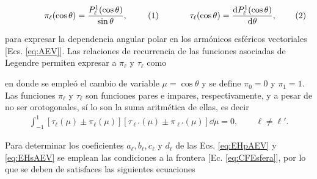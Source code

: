 	\begin{subequations}
	\eqhalf{\pi_\ell(\cos\theta)= \frac{P_\ell^1(\cos\theta)}{\sin\theta},
		\label{eqs:pi}}
	\eqhalf{\tau_\ell(\cos\theta) = \dv{P_\ell^1(\cos\theta)}{\theta},
		\label{eqs:tau}}	
	\label{eq:pitau}		
	\end{subequations}\vspace*{-1em}

\noindent para expresar la dependencia angular polar en los armónicos esféricos vectoriales [Ecs. \eqref{eq:AEV}]. Las relaciones de recurrencia de las funciones asociadas de Legendre \cite{arfken2001methods} permiten expresar a  $\pi_\ell$ y $\tau_\ell$ como  \cite{bohren1998absorption}  

		\vspace*{-1em}

\noindent en donde se empleó el cambio de variable $\mu = \cos\theta$ y se define   $\pi_0 =0 $ y $\pi_1 = 1$.  Las funciones $\pi_\ell$ y $\tau_\ell$ son funciones pares e impares, respectivamente, y a pesar de no ser orotogonales, sí lo son la suma aritmética de ellas, es decir \cite{bohren1998absorption}
	\begin{align}
	\int_{-1}^{1}[\tau_\ell(\mu)\pm\pi_\ell(\mu)]
	[\tau_{\ell'}(\mu)\pm\pi_{\ell'}(\mu)]\dd\mu = 0, \qquad \ell\neq \ell'. 
	\label{eq:ortTauPi}
	\end{align}

Para determinar los coeficientes $a_\ell,b_\ell,c_\ell$ y $d_\ell$ de las Ecs. \eqref{eq:EHpAEV} y \eqref{eq:EHsAEV} se emplean las condiciones a la frontera [Ec. \eqref{eq:CFEsfera}], por lo que se deben de satisfaces las siguientes ecuaciones 

	\vspace*{-1em}

